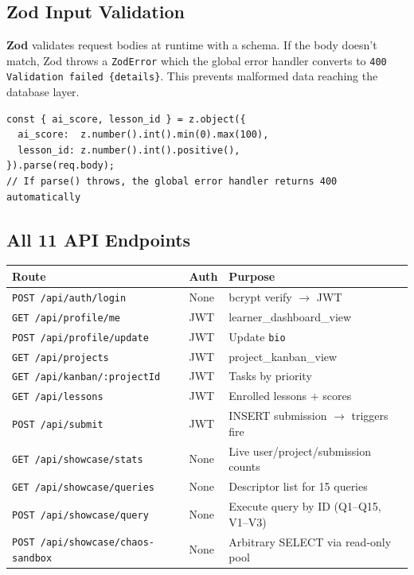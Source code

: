 \documentclass[11pt,a4paper]{article}
\newcommand{\T}[1]{\texttt{#1}}          %
\begin{document}
\subsection{Zod Input Validation}

\begin{defbox}
\textbf{Zod} validates request bodies at runtime with a schema. If the body doesn't
match, Zod throws a \T{ZodError} which the global error handler converts to
\T{400 Validation failed \{details\}}.
This prevents malformed data reaching the database layer.
\end{defbox}

\begin{lstlisting}[style=js]
const { ai_score, lesson_id } = z.object({
  ai_score:  z.number().int().min(0).max(100),
  lesson_id: z.number().int().positive(),
}).parse(req.body);
// If parse() throws, the global error handler returns 400 automatically
\end{lstlisting}

\subsection{All 11 API Endpoints}

\begin{center}
\renewcommand{\arraystretch}{1.2}
\begin{tabular}{@{}p{5.5cm}p{1.2cm}p{6.3cm}@{}}
\toprule
\rowcolor{tableheadbg}
{\color{white}\textbf{Route}} &
{\color{white}\textbf{Auth}} &
{\color{white}\textbf{Purpose}} \\
\midrule
\rowcolor{tablerowbg}
\T{POST /api/auth/login}              & None & bcrypt verify $\to$ JWT \\
\T{GET /api/profile/me}               & JWT  & learner\_dashboard\_view \\
\rowcolor{tablerowbg}
\T{POST /api/profile/update}          & JWT  & Update \T{bio} \\
\T{GET /api/projects}                 & JWT  & project\_kanban\_view \\
\rowcolor{tablerowbg}
\T{GET /api/kanban/:projectId}        & JWT  & Tasks by priority \\
\T{GET /api/lessons}                  & JWT  & Enrolled lessons + scores \\
\rowcolor{tablerowbg}
\T{POST /api/submit}                  & JWT  & INSERT submission $\to$ triggers fire \\
\T{GET /api/showcase/stats}           & None & Live user/project/submission counts \\
\rowcolor{tablerowbg}
\T{GET /api/showcase/queries}         & None & Descriptor list for 15 queries \\
\T{POST /api/showcase/query}          & None & Execute query by ID (Q1--Q15, V1--V3) \\
\rowcolor{tablerowbg}
\T{POST /api/showcase/chaos-sandbox}  & None & Arbitrary SELECT via read-only pool \\
\bottomrule
\end{tabular}
\end{center}
\end{document}

